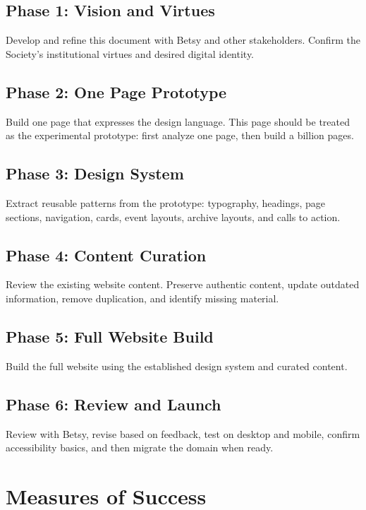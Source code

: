 \documentclass[11pt]{article}
\begin{document}
\subsection{Phase 1: Vision and Virtues}

Develop and refine this document with Betsy and other stakeholders. Confirm the Society's institutional virtues and desired digital identity.

\subsection{Phase 2: One Page Prototype}

Build one page that expresses the design language. This page should be treated as the experimental prototype: first analyze one page, then build a billion pages.

\subsection{Phase 3: Design System}

Extract reusable patterns from the prototype: typography, headings, page sections, navigation, cards, event layouts, archive layouts, and calls to action.

\subsection{Phase 4: Content Curation}

Review the existing website content. Preserve authentic content, update outdated information, remove duplication, and identify missing material.

\subsection{Phase 5: Full Website Build}

Build the full website using the established design system and curated content.

\subsection{Phase 6: Review and Launch}

Review with Betsy, revise based on feedback, test on desktop and mobile, confirm accessibility basics, and then migrate the domain when ready.

\section{Measures of Success}
\end{document}
